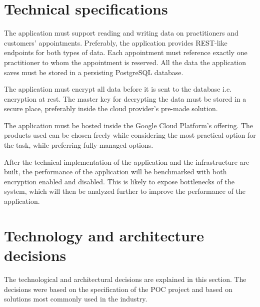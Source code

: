 \section{Technical specifications}

The application must support reading and writing data on practitioners and customers' appointments.
Preferably, the application provides REST-like endpoints for both types of data.
Each appointment must reference exactly one practitioner to whom the appointment is reserved.
All the data the application saves must be stored in a persisting PostgreSQL database.

The application must encrypt all data before it is sent to the database i.e. encryption at rest.
The master key for decrypting the data must be stored in a secure place, preferably inside the cloud provider's pre-made solution.

The application must be hosted inside the Google Cloud Platform's offering.
The products used can be chosen freely while considering the most practical option for the task, while preferring fully-managed options.

After the technical implementation of the application and the infrastructure are built, the performance of the application will be benchmarked with both encryption enabled and disabled.
This is likely to expose bottlenecks of the system, which will then be analyzed further to improve the performance of the application.




% 
%

\section{Technology and architecture decisions}

The technological and architectural decisions are explained in this section.
The decisions were based on the specification of the POC project and based on solutions most commonly used in the industry.


